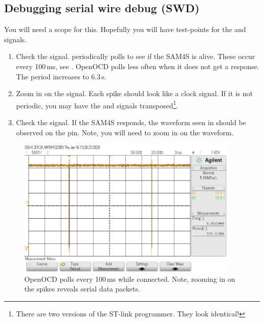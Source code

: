 \subsection{Debugging serial wire debug (SWD)}
\label{debugging-serial-wire-debug-swd}

You will need a scope for this.  Hopefully you will have test-points
for the  and  signals.

\begin{enumerate}
\item Check the  signal.   periodically
  polls to see if the SAM4S is alive.  These occur every 100\,ms, see
  .  OpenOCD polls less often when it does not
  get a response. The period increases to 6.3\,s.

\item Zoom in on the  signal.  Each spike should look like a
  clock signal.  If it is not periodic, you may have the  and
   signals transposed\footnote{There are two versions of the
    ST-link programmer.  They look identical!}.

\item Check the  signal.  If the SAM4S responds, the waveform
  seen in  should be observed on the
   pin.  Note, you will need to zoom in on the waveform.
\end{enumerate}


\begin{figure}[!h]
\centering
\includegraphics[height=2.60417in]{figs/OpenOCDTimingGood.png}
\caption{OpenOCD polls every 100\,ms while connected.  Note, zooming
  in on the spikes reveals serial data packets.}
\label{fig:openocd-poll}
\end{figure}

